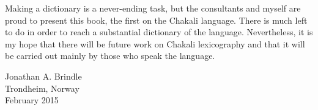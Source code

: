 Making a dictionary is a never-ending task, but the consultants and myself are  
proud to present this book, the first on the Chakali language. There is much 
left to do in order to reach a 
  substantial dictionary of the language.  Nevertheless, it is my hope that 
there will be  future work on Chakali lexicography  and that it will be carried 
out mainly  by those who speak the language. 

\begin{flushright}
 Jonathan A. Brindle\\ 
 Trondheim, Norway\\
February 2015\\

 \end{flushright}


\thispagestyle{plain}

